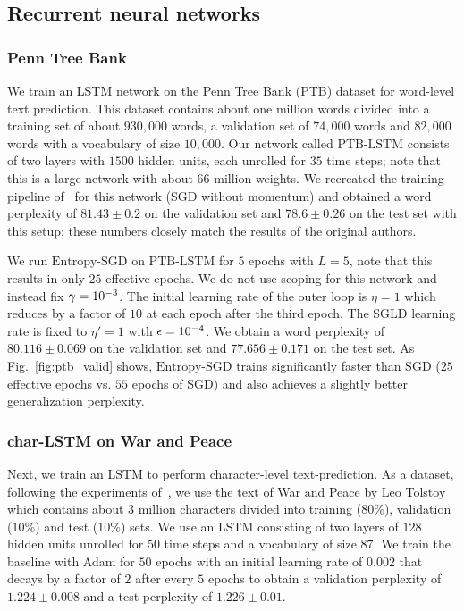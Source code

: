\documentclass[10pt]{article}
\newcommand{\entropysgd}{\mathrm{Entropy}\textrm{-}\mathrm{SGD}}
\newcommand{\ptblstm}{\textrm{PTB-LSTM}}
\begin{document}
\subsection{Recurrent neural networks}
\label{ss:expt:rnn}

\subsubsection{Penn Tree Bank}

We train an LSTM network on the Penn Tree Bank (PTB) dataset for word-level text prediction. This dataset contains about one million words divided into a training set of about $930,000$ words, a validation set of $74,000$ words and $82,000$ words with a vocabulary of size $10,000$. Our network called $\ptblstm$ consists of two layers with $1500$ hidden units, each unrolled for $35$ time steps; note that this is a large network with about $66$ million weights. We recreated the training pipeline of~\citet{zaremba2014recurrent} for this network (SGD without momentum) and obtained a word perplexity of $81.43 \pm 0.2$ on the validation set and $78.6 \pm 0.26$ on the test set with this setup; these numbers closely match the results of the original authors.

We run $\entropysgd$ on $\ptblstm$ for $5$ epochs with $L = 5$, note that this results in only $25$ effective epochs. We do not use scoping for this network and instead fix $\gamma = 10^{-3}$. The initial learning rate of the outer loop is $\eta = 1$ which reduces by a factor of $10$ at each epoch after the third epoch. The SGLD learning rate is fixed to $\eta' = 1$ with $\epsilon = 10^{-4}$. We obtain a word perplexity of $80.116 \pm 0.069$ on the validation set and $77.656 \pm 0.171$ on the test set. As Fig.~\ref{fig:ptb_valid} shows, $\entropysgd$ trains significantly faster than SGD ($25$ effective epochs vs. $55$ epochs of SGD) and also achieves a slightly better generalization perplexity.

\subsubsection{char-LSTM on War and Peace}

Next, we train an LSTM to perform character-level text-prediction. As a dataset, following the experiments of~\citet{karpathy2015visualizing}, we use the text of War and Peace by Leo Tolstoy which contains about $3$ million characters divided into training ($80\%$), validation ($10\%$) and test ($10\%$) sets. We use an LSTM consisting of two layers of $128$ hidden units unrolled for $50$ time steps and a vocabulary of size $87$. We train the baseline with Adam for $50$ epochs with an initial learning rate of $0.002$ that decays by a factor of $2$ after every $5$ epochs to obtain a validation perplexity of $1.224 \pm 0.008$ and a test perplexity of $1.226 \pm 0.01$.
\end{document}
